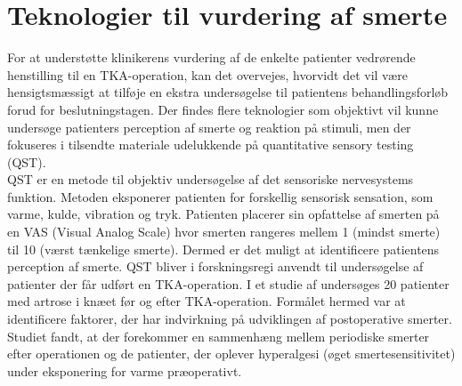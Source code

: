\section{Teknologier til vurdering af smerte}
For at understøtte klinikerens vurdering af de enkelte patienter vedrørende henstilling til en TKA-operation, kan det overvejes, hvorvidt det vil være hensigtsmæssigt at tilføje en ekstra undersøgelse til patientens behandlingsforløb forud for beslutningstagen. %
Der findes flere teknologier som objektivt vil kunne undersøge patienters perception af smerte og reaktion på stimuli, men der fokuseres i tilsendte materiale udelukkende på quantitative sensory testing (QST). \\
QST er en metode til objektiv undersøgelse af det sensoriske nervesystems funktion. %
Metoden eksponerer patienten for forskellig sensorisk sensation, som varme, kulde, vibration og tryk. Patienten placerer sin opfattelse af smerten på en VAS (Visual Analog Scale) hvor smerten rangeres mellem 1 (mindst smerte) til 10 (værst tænkelige smerte). Dermed er det muligt at identificere patientens perception af smerte.
QST bliver i forskningsregi anvendt til undersøgelse af patienter der får udført en TKA-operation. I et studie af  undersøges 20 patienter med artrose i knæet før og efter TKA-operation. Formålet hermed var at identificere faktorer, der har indvirkning på udviklingen af postoperative smerter. 
Studiet fandt, at der forekommer en sammenhæng mellem periodiske smerter efter operationen og de patienter, der oplever hyperalgesi (øget smertesensitivitet) under eksponering for varme præoperativt. \citep{Martinez2007} 

